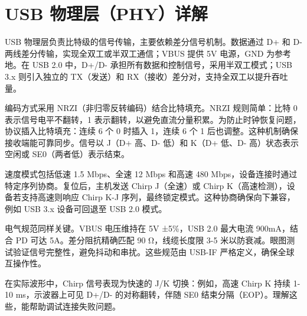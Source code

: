 \chapter{USB 物理层（PHY）详解}
USB 物理层负责比特级的信号传输，主要依赖差分信号机制。数据通过 D+ 和 D- 两线差分传输，实现全双工或半双工通信；VBUS 提供 5V 电源，GND 为参考地。在 USB 2.0 中，D+/D- 承担所有数据和控制信号，采用半双工模式；USB 3.x 则引入独立的 TX（发送）和 RX（接收）差分对，支持全双工以提升吞吐量。\par
编码方式采用 NRZI（非归零反转编码）结合比特填充。NRZI 规则简单：比特 0 表示信号电平不翻转，1 表示翻转，以避免直流分量积累。为防止时钟恢复问题，协议插入比特填充：连续 6 个 0 时插入 1，连续 6 个 1 后也调整。这种机制确保接收端能可靠同步。信号以 J（D+ 高、D- 低）和 K（D+ 低、D- 高）状态表示空闲或 SE0（两者低）表示结束。\par
速度模式包括低速 1.5 Mbps、全速 12 Mbps 和高速 480 Mbps，设备连接时通过特定序列协商。复位后，主机发送 Chirp J（全速）或 Chirp K（高速检测），设备若支持高速则响应 Chirp K-J 序列，最终锁定模式。这种协商确保向下兼容，例如 USB 3.x 设备可回退至 USB 2.0 模式。\par
电气规范同样关键。VBUS 电压维持在 5V ±5\%{}，USB 2.0 最大电流 900mA，结合 PD 可达 5A。差分阻抗精确匹配 90 Ω，线缆长度限 3-5 米以防衰减。眼图测试验证信号完整性，避免抖动和串扰。这些规范由 USB-IF 严格定义，确保全球互操作性。\par
在实际波形中，Chirp 信号表现为快速的 J/K 切换：例如，高速 Chirp K 持续 1-10 ms，示波器上可见 D+/D- 的对称翻转，伴随 SE0 结束分隔（EOP）。理解这些，能帮助调试连接失败问题。\par
